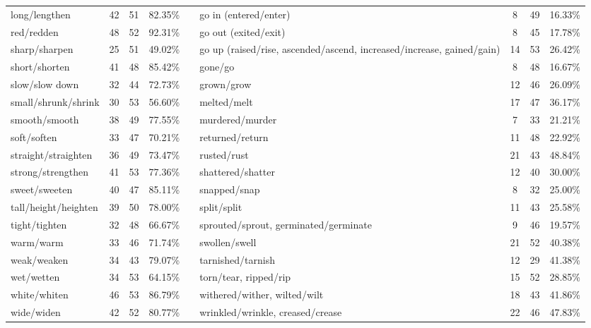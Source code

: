 \begin{tabular}{p{3cm}ccccp{3cm}ccc}
long/lengthen & 42 & 51 & 82.35\% & & go in (entered/enter) & 8 & 49 & 16.33\% \\
red/redden & 48 & 52 & 92.31\% & & go out (exited/exit) & 8 & 45 & 17.78\% \\
sharp/sharpen & 25 & 51 & 49.02\% & & go up (raised/rise, ascended/ascend, increased/increase, gained/gain) & 14 & 53 & 26.42\% \\
short/shorten & 41 & 48 & 85.42\% & & gone/go & 8 & 48 & 16.67\% \\
slow/slow down & 32 & 44 & 72.73\% & & grown/grow & 12 & 46 & 26.09\% \\
small/shrunk/shrink & 30 & 53 & 56.60\% & & melted/melt & 17 & 47 & 36.17\% \\
smooth/smooth & 38 & 49 & 77.55\% & & murdered/murder & 7 & 33 & 21.21\% \\
soft/soften & 33 & 47 & 70.21\% & & returned/return & 11 & 48 & 22.92\% \\
straight/straighten & 36 & 49 & 73.47\% & & rusted/rust & 21 & 43 & 48.84\% \\
strong/strengthen & 41 & 53 & 77.36\% & & shattered/shatter & 12 & 40 & 30.00\% \\
sweet/sweeten & 40 & 47 & 85.11\% & & snapped/snap & 8 & 32 & 25.00\% \\
tall/height/heighten & 39 & 50 & 78.00\% & & split/split & 11 & 43 & 25.58\% \\
tight/tighten & 32 & 48 & 66.67\% & & sprouted/sprout, germinated/germinate & 9 & 46 & 19.57\% \\
warm/warm & 33 & 46 & 71.74\% & & swollen/swell & 21 & 52 & 40.38\% \\
weak/weaken & 34 & 43 & 79.07\% & & tarnished/tarnish & 12 & 29 & 41.38\% \\
wet/wetten & 34 & 53 & 64.15\% & & torn/tear, ripped/rip & 15 & 52 & 28.85\% \\
white/whiten & 46 & 53 & 86.79\% & & withered/wither, wilted/wilt & 18 & 43 & 41.86\% \\
wide/widen & 42 & 52 & 80.77\% & & wrinkled/wrinkle, creased/crease & 22 & 46 & 47.83\%
\end{tabular}